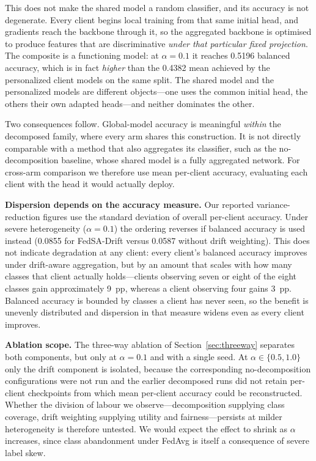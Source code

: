 \documentclass{ieeeaccess}
\newcommand{\sadrift}{FedSA-Drift}
\begin{document}
This does not make the shared model a random classifier, and its accuracy is not degenerate. Every client begins local training from that same initial head, and gradients reach the backbone through it, so the aggregated backbone is optimised to produce features that are discriminative \emph{under that particular fixed projection}. The composite is a functioning model: at $\alpha{=}0.1$ it reaches 0.5196 balanced accuracy, which is in fact \emph{higher} than the 0.4382 mean achieved by the personalized client models on the same split. The shared model and the personalized models are different objects---one uses the common initial head, the others their own adapted heads---and neither dominates the other.

Two consequences follow. Global-model accuracy is meaningful \emph{within} the decomposed family, where every arm shares this construction. It is not directly comparable with a method that also aggregates its classifier, such as the no-decomposition baseline, whose shared model is a fully aggregated network. For cross-arm comparison we therefore use mean per-client accuracy, evaluating each client with the head it would actually deploy.

\textbf{Dispersion depends on the accuracy measure.} Our reported variance-reduction figures use the standard deviation of overall per-client accuracy. Under severe heterogeneity ($\alpha = 0.1$) the ordering reverses if balanced accuracy is used instead (0.0855 for \sadrift{} versus 0.0587 without drift weighting). This does not indicate degradation at any client: every client's balanced accuracy improves under drift-aware aggregation, but by an amount that scales with how many classes that client actually holds---clients observing seven or eight of the eight classes gain approximately 9~pp, whereas a client observing four gains 3~pp. Balanced accuracy is bounded by classes a client has never seen, so the benefit is unevenly distributed and dispersion in that measure widens even as every client improves.

\textbf{Ablation scope.} The three-way ablation of Section~\ref{sec:threeway} separates both components, but only at $\alpha = 0.1$ and with a single seed. At $\alpha \in \{0.5, 1.0\}$ only the drift component is isolated, because the corresponding no-decomposition configurations were not run and the earlier decomposed runs did not retain per-client checkpoints from which mean per-client accuracy could be reconstructed. Whether the division of labour we observe---decomposition supplying class coverage, drift weighting supplying utility and fairness---persists at milder heterogeneity is therefore untested. We would expect the effect to shrink as $\alpha$ increases, since class abandonment under FedAvg is itself a consequence of severe label skew.
\end{document}
